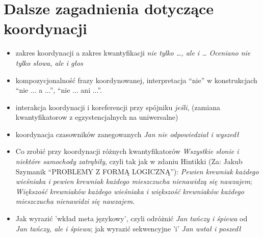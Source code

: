 \documentclass[a4paper,12pt]{article}
\begin{document}
\section{Dalsze zagadnienia dotyczące koordynacji}
\begin{itemize}
\item zakres koordynacji a zakres kwantyfikacji {\it nie tylko \dots, ale i \dots} {\it Oceniano nie tylko słowa, ale i głos}
\item kompozycjonalność frazy koordynowanej,
interpretacja ``nie'' w konstrukcjach ``nie ... a ...'', ``nie ... ani ...''.
\item interakcja koordynacji i koreferencji przy spójniku {\it jeśli}, (zamiana kwantyfikatorow z egzystencjalnych na uniwersalne)
\item koordynacja czasowników zanegowanych {\it Jan nie odpowiedział i wyszedł}
\item  Co zrobić przy koordynacji różnych kwantyfikatorów {\it Wszystkie słonie i niektóre samochody zatrąbiły}, czyli
tak jak w zdaniu Hintikki (Za: Jakub Szymanik ``PROBLEMY Z FORMĄ LOGICZNĄ''): 
{\it Pewien krewniak każdego wieśniaka i pewien krewniak każdego mieszczucha nienawidzą się nawzajem};
{\it Większość krewniaków każdego wieśniaka i większość krewniaków każdego mieszczucha nienawidzi się nawzajem}.
\item Jak wyrazić 'wkład meta językowy', czyli odróżnić {\it Jan tańczy i śpiewa} od {\it Jan tańczy, ale i śpiewa};
jak wyrazić sekwencyjne 'i' {\it Jan wstał i poszedł}
\end{itemize}
\end{document}
